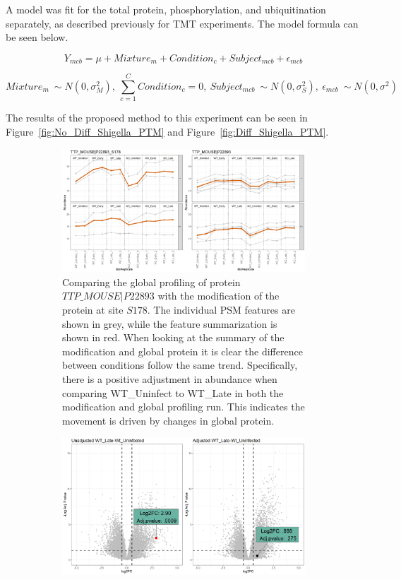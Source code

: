 \documentclass{mcp}
\def\sfigref#1{{Figure~\ref{#1}}}
\begin{document}
A model was fit for the total protein, phosphorylation, and ubiquitination separately, as described previously for TMT experiments. The model formula can be seen below.

$$Y_{mcb} = \mu + Mixture_m + Condition_c + Subject_{mcb} + \epsilon_{mcb}$$

$$Mixture_m ~ \sim N(0, \sigma^2_M) ,\: \sum_{c=1}^C{Condition_c} = 0 ,\: Subject_{mcb} ~ \sim N(0, \sigma^2_S) ,\: \epsilon_{mcb} ~ \sim N(0, \sigma^2)$$

The results of the proposed method to this experiment can be seen in \sfigref{fig:No_Diff_Shigella_PTM} and \sfigref{fig:Diff_Shigella_PTM}.


\begin{figure}[h!]
\centering
 \begin{subfigure}{\textwidth}
	\includegraphics[width=\textwidth]{sim_new/No_Difference_Shigella_Profile_Plot}
	\caption{Comparing the global profiling of protein $TTP\_MOUSE|P22893$ with the modification of the protein at site $S178$. The individual PSM features are shown in grey, while the feature summarization is shown in red. When looking at the summary of the modification and global protein it is clear the difference between conditions follow the same trend. Specifically, there is a positive adjustment in abundance when comparing WT\_Uninfect to WT\_Late in both the modification and global profiling run. This indicates the movement is driven by changes in global protein.}
 \end{subfigure}
 \begin{subfigure}{\textwidth}
	\includegraphics[width=\textwidth]{sim_new/No_Difference_Shigella_Volcano}

\end{subfigure}
\end{figure}
\end{document}
